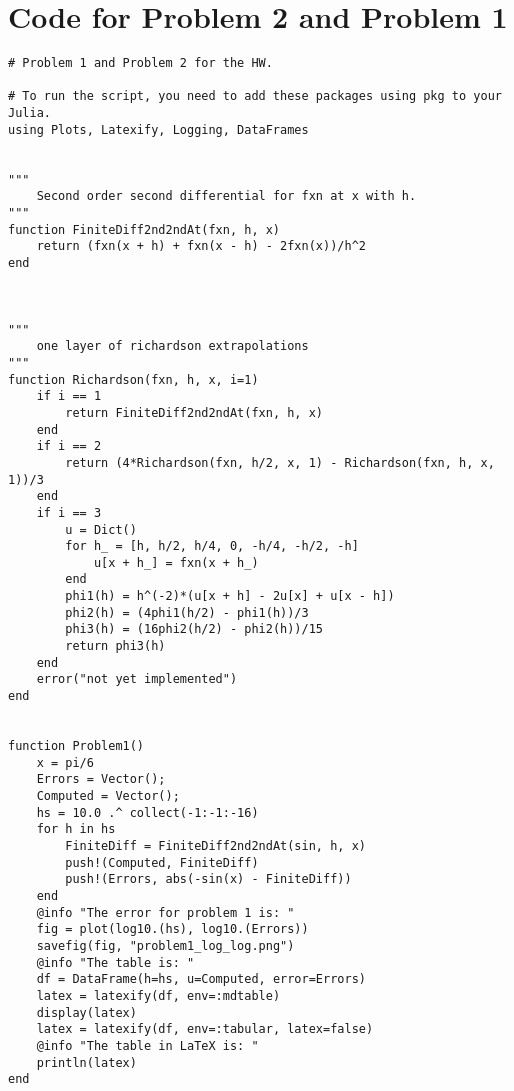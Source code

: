 \documentclass[]{article}
\begin{document}
\section*{Code for Problem 2 and Problem 1}



\begin{verbatim}
# Problem 1 and Problem 2 for the HW. 

# To run the script, you need to add these packages using pkg to your Julia. 
using Plots, Latexify, Logging, DataFrames


"""
    Second order second differential for fxn at x with h. 
"""
function FiniteDiff2nd2ndAt(fxn, h, x)
    return (fxn(x + h) + fxn(x - h) - 2fxn(x))/h^2
end



"""
    one layer of richardson extrapolations 
"""
function Richardson(fxn, h, x, i=1)
    if i == 1
        return FiniteDiff2nd2ndAt(fxn, h, x)
    end
    if i == 2
        return (4*Richardson(fxn, h/2, x, 1) - Richardson(fxn, h, x, 1))/3
    end
    if i == 3
        u = Dict()
        for h_ = [h, h/2, h/4, 0, -h/4, -h/2, -h]
            u[x + h_] = fxn(x + h_)
        end
        phi1(h) = h^(-2)*(u[x + h] - 2u[x] + u[x - h])
        phi2(h) = (4phi1(h/2) - phi1(h))/3
        phi3(h) = (16phi2(h/2) - phi2(h))/15
        return phi3(h)
    end
    error("not yet implemented")
end


function Problem1()
    x = pi/6
    Errors = Vector();
    Computed = Vector();
    hs = 10.0 .^ collect(-1:-1:-16)
    for h in hs
        FiniteDiff = FiniteDiff2nd2ndAt(sin, h, x)
        push!(Computed, FiniteDiff)
        push!(Errors, abs(-sin(x) - FiniteDiff))
    end
    @info "The error for problem 1 is: "
    fig = plot(log10.(hs), log10.(Errors))
    savefig(fig, "problem1_log_log.png")
    @info "The table is: "
    df = DataFrame(h=hs, u=Computed, error=Errors)
    latex = latexify(df, env=:mdtable)
    display(latex)
    latex = latexify(df, env=:tabular, latex=false)
    @info "The table in LaTeX is: "
    println(latex)
end



\end{verbatim}
\end{document}
